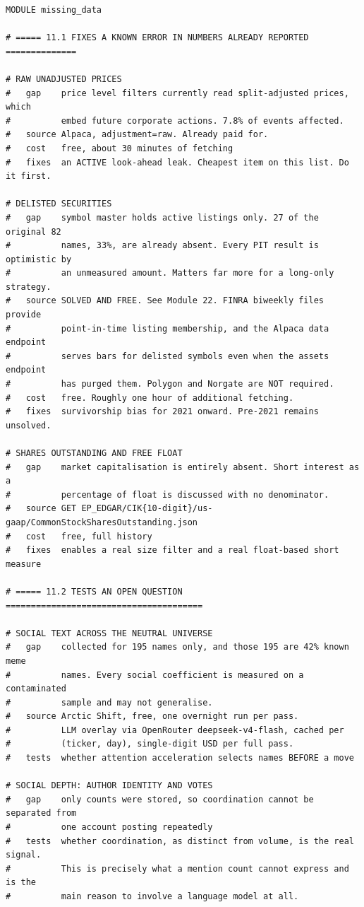 \documentclass[10pt]{article}
\begin{document}
\begin{lstlisting}
MODULE missing_data

# ===== 11.1 FIXES A KNOWN ERROR IN NUMBERS ALREADY REPORTED ==============

# RAW UNADJUSTED PRICES
#   gap    price level filters currently read split-adjusted prices, which
#          embed future corporate actions. 7.8% of events affected.
#   source Alpaca, adjustment=raw. Already paid for.
#   cost   free, about 30 minutes of fetching
#   fixes  an ACTIVE look-ahead leak. Cheapest item on this list. Do it first.

# DELISTED SECURITIES
#   gap    symbol master holds active listings only. 27 of the original 82
#          names, 33%, are already absent. Every PIT result is optimistic by
#          an unmeasured amount. Matters far more for a long-only strategy.
#   source SOLVED AND FREE. See Module 22. FINRA biweekly files provide
#          point-in-time listing membership, and the Alpaca data endpoint
#          serves bars for delisted symbols even when the assets endpoint
#          has purged them. Polygon and Norgate are NOT required.
#   cost   free. Roughly one hour of additional fetching.
#   fixes  survivorship bias for 2021 onward. Pre-2021 remains unsolved.

# SHARES OUTSTANDING AND FREE FLOAT
#   gap    market capitalisation is entirely absent. Short interest as a
#          percentage of float is discussed with no denominator.
#   source GET EP_EDGAR/CIK{10-digit}/us-gaap/CommonStockSharesOutstanding.json
#   cost   free, full history
#   fixes  enables a real size filter and a real float-based short measure

# ===== 11.2 TESTS AN OPEN QUESTION =======================================

# SOCIAL TEXT ACROSS THE NEUTRAL UNIVERSE
#   gap    collected for 195 names only, and those 195 are 42% known meme
#          names. Every social coefficient is measured on a contaminated
#          sample and may not generalise.
#   source Arctic Shift, free, one overnight run per pass.
#          LLM overlay via OpenRouter deepseek-v4-flash, cached per
#          (ticker, day), single-digit USD per full pass.
#   tests  whether attention acceleration selects names BEFORE a move

# SOCIAL DEPTH: AUTHOR IDENTITY AND VOTES
#   gap    only counts were stored, so coordination cannot be separated from
#          one account posting repeatedly
#   tests  whether coordination, as distinct from volume, is the real signal.
#          This is precisely what a mention count cannot express and is the
#          main reason to involve a language model at all.


\end{lstlisting}
\end{document}
